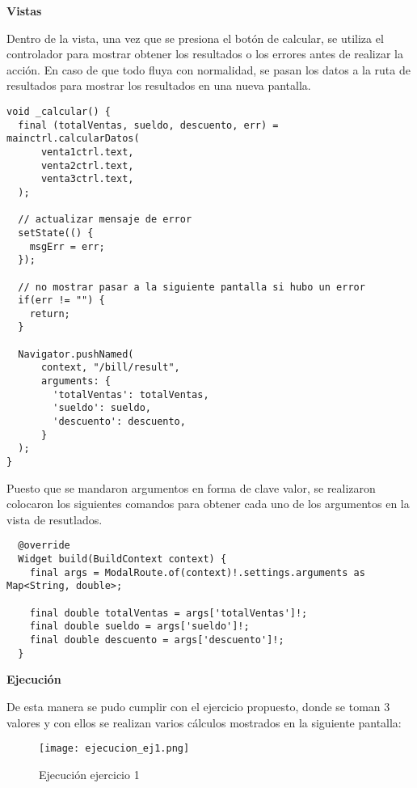 \textbf{Vistas}

Dentro de la vista, una vez que se presiona el botón de calcular, se utiliza el controlador para mostrar obtener los resultados o los errores antes de realizar la acción. En caso de que todo fluya con normalidad, se pasan los datos a la ruta de resultados para mostrar los resultados en una nueva pantalla.

\begin{center}
\begin{lstlisting}
void _calcular() {
  final (totalVentas, sueldo, descuento, err) = mainctrl.calcularDatos(
      venta1ctrl.text,
      venta2ctrl.text,
      venta3ctrl.text,
  );

  // actualizar mensaje de error
  setState(() {
    msgErr = err;
  });

  // no mostrar pasar a la siguiente pantalla si hubo un error
  if(err != "") {
    return;
  }

  Navigator.pushNamed(
      context, "/bill/result",
      arguments: {
        'totalVentas': totalVentas,
        'sueldo': sueldo,
        'descuento': descuento,
      }
  );
}
\end{lstlisting}
\end{center}

Puesto que se mandaron argumentos en forma de clave valor, se realizaron colocaron los siguientes comandos para obtener cada uno de los argumentos en la vista de resutlados.

\begin{center}
\begin{lstlisting}
  @override
  Widget build(BuildContext context) {
    final args = ModalRoute.of(context)!.settings.arguments as Map<String, double>;

    final double totalVentas = args['totalVentas']!;
    final double sueldo = args['sueldo']!;
    final double descuento = args['descuento']!;
  }
\end{lstlisting}
\end{center}

\textbf{Ejecución}

De esta manera se pudo cumplir con el ejercicio propuesto, donde se toman 3 valores y con ellos se realizan varios cálculos mostrados en la siguiente pantalla:

\begin{figure}[H]
    \centering
    \texttt{[image: ejecucion\_ej1.png]}
    \caption{Ejecución ejercicio 1}
    \label{fig:ej1_ejecuccion}
\end{figure}